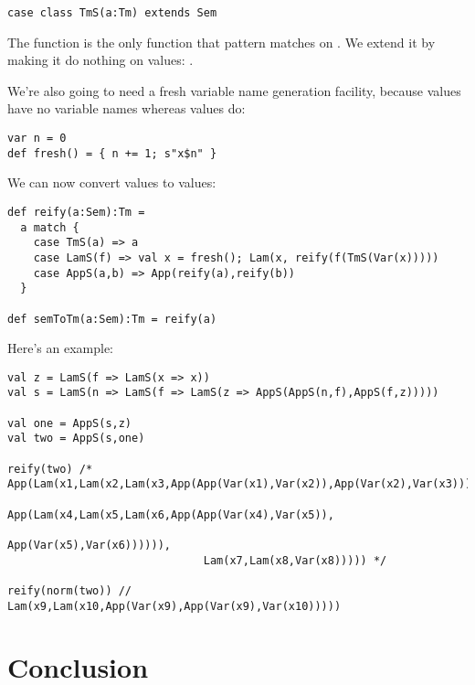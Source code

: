 \begin{lstlisting}
case class TmS(a:Tm) extends Sem
\end{lstlisting}

The  function is the only function that pattern matches on . We extend it by making it do nothing on  values: .

We're also going to need a fresh variable name generation facility, because  values have no variable names whereas  values do:

\begin{lstlisting}
var n = 0
def fresh() = { n += 1; s"x$n" }
\end{lstlisting}

We can now convert  values to  values:

\begin{lstlisting}
def reify(a:Sem):Tm =
  a match {
    case TmS(a) => a
    case LamS(f) => val x = fresh(); Lam(x, reify(f(TmS(Var(x)))))
    case AppS(a,b) => App(reify(a),reify(b))
  }

def semToTm(a:Sem):Tm = reify(a)
\end{lstlisting}

Here's an example:

\begin{lstlisting}
val z = LamS(f => LamS(x => x))
val s = LamS(n => LamS(f => LamS(z => AppS(AppS(n,f),AppS(f,z)))))

val one = AppS(s,z)
val two = AppS(s,one)

reify(two) /* App(Lam(x1,Lam(x2,Lam(x3,App(App(Var(x1),Var(x2)),App(Var(x2),Var(x3)))))),
                        App(Lam(x4,Lam(x5,Lam(x6,App(App(Var(x4),Var(x5)),
                                                          App(Var(x5),Var(x6)))))),
                              Lam(x7,Lam(x8,Var(x8))))) */

reify(norm(two)) // Lam(x9,Lam(x10,App(Var(x9),App(Var(x9),Var(x10)))))
\end{lstlisting}


\section{Conclusion}

